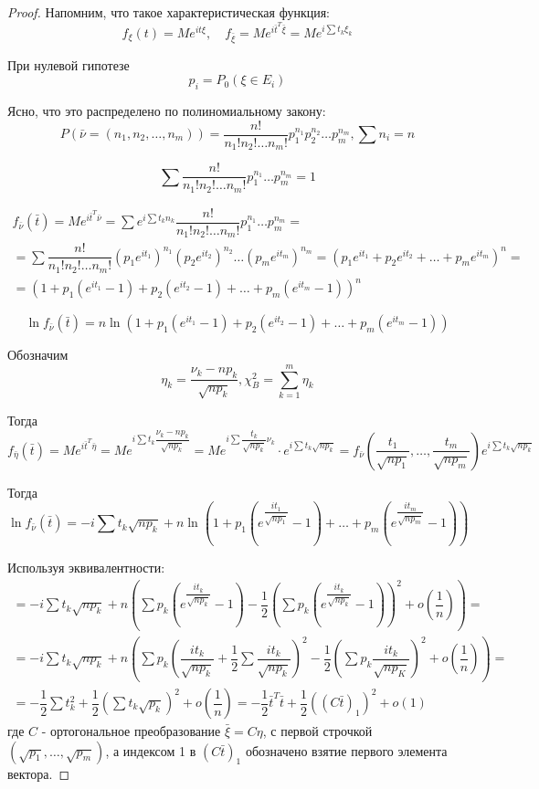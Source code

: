 \begin{proof}
  Напомним, что такое характеристическая функция:
  \[
    f_\xi (t) = M e^{i t \xi},\quad f_{\bar \xi} = M e^{i \bar t^T \bar \xi} = M e^{i \sum t_k \xi_k}
  \]

  При нулевой гипотезе
  \[
    p_i = P_0 (\xi \in E_i)
  \]

  Ясно, что это распределено по полиномиальному закону:
  \[
    P(\bar \nu = (n_1, n_2, \dots, n_m)) = \dfrac{n!}{n_1! n_2! \dots n_m!} p_1^{n_1} p_2^{n_2} \dots p_m^{n_m}, \sum n_i = n
  \]

  \[
    \sum \dfrac{n!}{n_1! n_2! \dots n_m!} p_1^{n_1} \dots p_m^{n_m} = 1
  \]

  \begin{multline*}
    f_{\bar \nu} (\bar t) = M e^{i \bar t^T \bar \nu} =
    \sum e^{i \sum t_k n_k} \dfrac{n!}{n_1! n_2! \dots n_m!} p_1^{n_1} \dots p_m^{n_m} = \\
    = \sum \dfrac{n!}{n_1! n_2! \dots n_m!} (p_1 e^{i t_1})^{n_1} (p_2 e^{i t_2})^{n_2} \dots (p_m e^{i t_m})^{n_m} = 
    (p_1 e^{i t_1} + p_2 e^{i t_2} + \dots + p_m e^{i t_m})^n = \\
    = (1 + p_1 (e^{i t_1} - 1) + p_2 (e^{i t_2} - 1) + \dots + p_m (e^{i t_m} - 1))^n
  \end{multline*}

  \[
    \ln f_{\bar \nu} (\bar t) = n \ln (1 + p_1 (e^{i t_1} - 1) + p_2 (e^{i t_2} - 1) + \dots + p_m (e^{i t_m} - 1))
  \]

  Обозначим
  \[
    \eta_k = \dfrac{\nu_k - np_k}{\sqrt{np_k}}, \chi^2_B = \sum_{k=1}^m \eta_k
  \]

  Тогда
  \[
    f_{\bar \eta} (\bar t) = M e^{i \bar t^T \bar \eta} =
    M e^{i \sum t_k \dfrac{\nu_k - np_k}{\sqrt{np_k}}} = 
    M e^{i \sum \dfrac{t_k}{\sqrt{np_k}} \nu_k} \cdot e^{i \sum t_k \sqrt{np_k}} = 
    f_{\bar \nu} (\dfrac{t_1}{\sqrt{np_1}}, \dots, \dfrac{t_m}{\sqrt{np_m}}) e^{i \sum t_k \sqrt{np_k}}
  \]

  Тогда
  \[
    \ln f_{\bar \nu} (\bar t) = -i \sum t_k \sqrt{np_k} + n \ln (1+p_1 (e^{\dfrac{i t_1}{\sqrt{np_1}}} - 1)+ \dots + p_m (e^{\dfrac{i t_m}{\sqrt{np_m}}} - 1) )
  \]

  Используя эквивалентности:
  \begin{multline*}
    = -i \sum t_k \sqrt{np_k} + n \left( \sum p_k (e^{\dfrac{i t_k}{\sqrt{np_k}}} - 1) - \dfrac{1}{2} (\sum p_k(e^{\dfrac{i t_k}{\sqrt{np_k}}} - 1))^2 + o(\dfrac{1}{n}) \right) = \\
    = -i \sum t_k \sqrt{np_k} + n \left( \sum p_k (\dfrac{i t_k}{\sqrt{np_k}} + \dfrac{1}{2} \sum \dfrac{i t_k}{\sqrt{np_k}})^2 - \dfrac{1}{2} (\sum p_k \dfrac{i t_k}{\sqrt{np_K}})^2 + o(\dfrac{1}{n}) \right) = \\
    = - \dfrac{1}{2} \sum t_k^2 + \dfrac{1}{2} \left( \sum t_k \sqrt{p_k} \right)^2 + o\left(\dfrac{1}{n}\right)
    = - \dfrac{1}{2} \bar t^T \bar t + \dfrac{1}{2} ((C \bar t)_1)^2 + o(1)
  \end{multline*}
  где $C$ - ортогональное преобразование $\bar \xi = C \eta$, с первой строчкой $(\sqrt{p_1}, \dots, \sqrt{p_m})$,
    а индексом 1 в $(C \bar t)_1$ обозначено взятие первого элемента вектора.


\end{proof}
